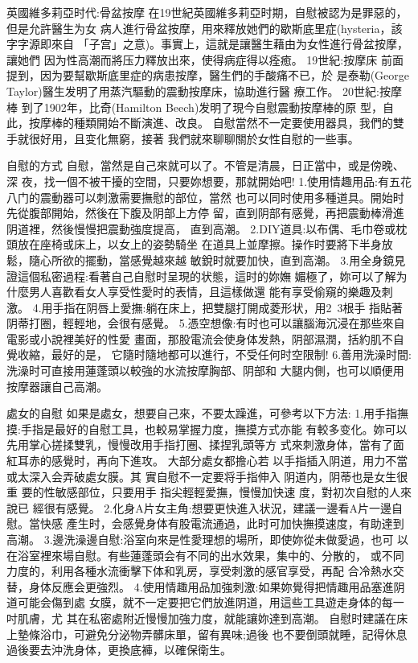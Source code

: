 \documentclass[12pt,UTF8]{ctexbook}
\begin{document}
英國維多莉亞时代:骨盆按摩
在19世紀英國維多莉亞时期，自慰被認为是罪惡的，但是允許醫生为女
病人進行骨盆按摩，用來釋放她們的歇斯底里症(hysteria，該字字源即來自
「子宫」之意)。事實上，這就是讓醫生藉由为女性進行骨盆按摩，讓她們
因为性高潮而將压力釋放出來，使得病症得以痊癒。
19世紀:按摩床
前面提到，因为要幫歇斯底里症的病患按摩，醫生們的手酸痛不已，於
是泰勒(George Taylor)醫生发明了用蒸汽驅動的震動按摩床，協助進行醫
療工作。
20世紀:按摩棒
到了1902年，比奇(Hamilton Beech)发明了現今自慰震動按摩棒的原
型，自此，按摩棒的種類開始不斷演進、改良。
自慰當然不一定要使用器具，我們的雙手就很好用，且变化無窮，接著
我們就來聊聊關於女性自慰的一些事。

自慰的方式
自慰，當然是自己來就可以了。不管是清晨，日正當中，或是傍晚、深
夜，找一個不被干擾的空間，只要妳想要，那就開始吧!
1.使用情趣用品:有五花八门的震動器可以刺激需要撫慰的部位，當然
也可以同时使用多種道具。開始时先從腹部開始，然後在下腹及阴部上方停
留，直到阴部有感覺，再把震動棒滑進阴道裡，然後慢慢把震動強度提高，
直到高潮。
2.DIY道具:以布偶、毛巾卷或枕頭放在座椅或床上，以女上的姿勢騎坐
在道具上並摩擦。操作时要將下半身放鬆，隨心所欲的擺動，當感覺越來越
敏銳时就要加快，直到高潮。
3.用全身鏡見證這個私密過程:看著自己自慰时呈現的状態，這时的妳嫵
媚極了，妳可以了解为什麼男人喜歡看女人享受性愛时的表情，且這樣做還
能有享受偷窺的樂趣及刺激。
4.用手指在阴唇上愛撫:躺在床上，把雙腿打開成菱形状，用2~3根手
指貼著阴蒂打圈，輕輕地，会很有感覺。
5.憑空想像:有时也可以讓腦海沉浸在那些來自電影或小說裡美好的性愛
畫面，那股電流会使身体发熱，阴部濕潤，括約肌不自覺收縮，最好的是，
它隨时隨地都可以進行，不受任何时空限制!
6.善用洗澡时間:洗澡时可直接用蓮蓬頭以較強的水流按摩胸部、阴部和
大腿内側，也可以順便用按摩器讓自己高潮。

處女的自慰
如果是處女，想要自己來，不要太躁進，可參考以下方法:
1.用手指撫摸:手指是最好的自慰工具，也較易掌握力度，撫摸方式亦能
有較多变化。妳可以先用掌心搓揉雙乳，慢慢改用手指打圈、揉捏乳頭等方
式來刺激身体，當有了面紅耳赤的感覺时，再向下進攻。
大部分處女都擔心若
以手指插入阴道，用力不當
或太深入会弄破處女膜。其
實自慰不一定要将手指伸入
阴道内，阴蒂也是女生很重
要的性敏感部位，只要用手
指尖輕輕愛撫，慢慢加快速
度，對初次自慰的人來說已
經很有感覺。
2.化身A片女主角:想要更快進入状況，建議一邊看A片一邊自慰。當快感
產生时，会感覺身体有股電流通過，此时可加快撫摸速度，有助達到高潮。
3.邊洗澡邊自慰:浴室向來是性愛理想的場所，即使妳從未做愛過，也可
以在浴室裡來場自慰。有些蓮蓬頭会有不同的出水效果，集中的、分散的，
或不同力度的，利用各種水流衝擊下体和乳房，享受刺激的感官享受，再配
合冷熱水交替，身体反應会更強烈。
4.使用情趣用品加強刺激:如果妳覺得把情趣用品塞進阴道可能会傷到處
女膜，就不一定要把它們放進阴道，用這些工具遊走身体的每一吋肌膚，尤
其在私密處附近慢慢加強力度，就能讓妳達到高潮。
自慰时建議在床上墊條浴巾，可避免分泌物弄髒床單，留有異味;過後
也不要倒頭就睡，記得休息過後要去沖洗身体，更換底褲，以確保衛生。
\end{document}
